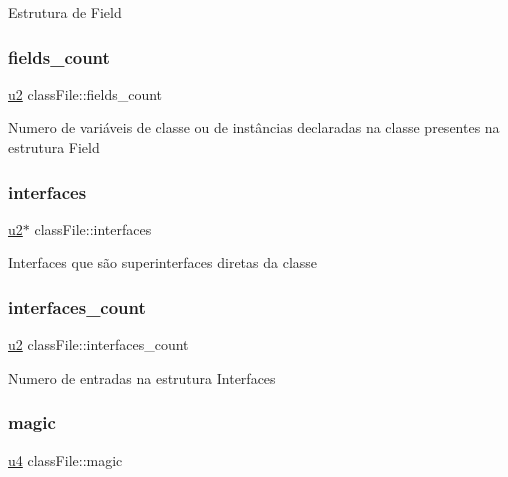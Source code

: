 Estrutura de Field \mbox{\label{structclassFile_aab140aacadd635ec42e6117d90f7363a}} 
\subsubsection{\texorpdfstring{fields\+\_\+count}{fields\_count}}
{\footnotesize\ttfamily \hyperlink{lista__operandos_8h_a732cde1300aafb73b0ea6c2558a7a54f}{u2} class\+File\+::fields\+\_\+count}

Numero de variáveis de classe ou de instâncias declaradas na classe presentes na estrutura Field \mbox{\label{structclassFile_a4b17bc5bb5475d1f7db40302ba9e1df1}} 
\subsubsection{\texorpdfstring{interfaces}{interfaces}}
{\footnotesize\ttfamily \hyperlink{lista__operandos_8h_a732cde1300aafb73b0ea6c2558a7a54f}{u2}$\ast$ class\+File\+::interfaces}

Interfaces que são superinterfaces diretas da classe \mbox{\label{structclassFile_ab1ef5a76288d97e248fd48a46e93a185}} 
\subsubsection{\texorpdfstring{interfaces\+\_\+count}{interfaces\_count}}
{\footnotesize\ttfamily \hyperlink{lista__operandos_8h_a732cde1300aafb73b0ea6c2558a7a54f}{u2} class\+File\+::interfaces\+\_\+count}

Numero de entradas na estrutura Interfaces \mbox{\label{structclassFile_a3fec808625410854af3cb80b7faeca10}} 
\subsubsection{\texorpdfstring{magic}{magic}}
{\footnotesize\ttfamily \hyperlink{lista__operandos_8h_ae5be1f726785414dd1b77d60df074c9d}{u4} class\+File\+::magic}

